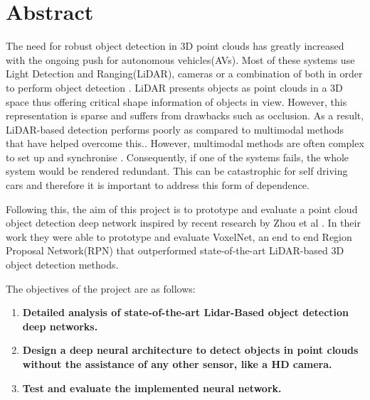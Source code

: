 %
%
%

\chapter*{Abstract}
\begin{SingleSpace}
\initial 
{T}he need for robust object detection in 3D point clouds has greatly increased with the ongoing push for autonomous vehicles(AVs). Most of these systems use Light Detection and Ranging(LiDAR), cameras or a combination of both in order to perform object detection \cite{ku2017joint}. LiDAR presents objects as point clouds in a 3D space thus offering critical shape information of objects in view. However, this representation is sparse and suffers from drawbacks such as occlusion. As a result, LiDAR-based detection performs poorly as compared to multimodal methods that have helped overcome this.\cite{zhou2017voxelnet}. However, multimodal methods are often complex to set up and synchronise \cite{ku2017joint}. Consequently, if one of the systems fails, the whole system would be rendered redundant. This can be catastrophic for self driving cars and therefore it is important to address this form of dependence. 

Following this, the aim of this project is to prototype and evaluate a point cloud object detection deep network inspired by recent research by Zhou et al \cite{zhou2017voxelnet}. In their work they were able to prototype and evaluate VoxelNet, an end to end Region Proposal Network(RPN) that outperformed state-of-the-art LiDAR-based 3D object detection methods. 

The objectives of the  project are as follows:
\begin{enumerate}
    \item \textbf{Detailed analysis of state-of-the-art Lidar-Based object detection deep networks.}
    \item \textbf {Design a deep neural architecture to detect objects in point clouds without the assistance of any other sensor, like a HD camera.}
    \item \textbf {Test and evaluate the implemented neural network.}
\end{enumerate}






\end{SingleSpace}
